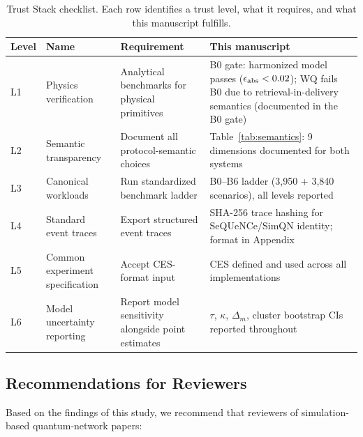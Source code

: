 \documentclass[aps,prapplied,reprint,superscriptaddress]{revtex4-2}
\begin{document}
\begin{table}[t]
\centering
\caption{Trust Stack checklist. Each row identifies a trust level, what it requires, and what this manuscript fulfills.}
\label{tab:truststack}
\small
\begin{tabularx}{\textwidth}{p{1.2cm}p{3.5cm}p{4cm}p{4cm}}
\toprule
Level & Name & Requirement & This manuscript \\
\midrule
L1 & Physics verification & Analytical benchmarks for physical primitives & B0 gate: harmonized model passes ($\epsilon_{\rm abs} < 0.02$); WQ fails B0 due to retrieval-in-delivery semantics (documented in the B0 gate) \\
L2 & Semantic transparency & Document all protocol-semantic choices & Table~\ref{tab:semantics}: 9 dimensions documented for both systems \\
L3 & Canonical workloads & Run standardized benchmark ladder & B0--B6 ladder (3,950 + 3,840 scenarios), all levels reported \\
L4 & Standard event traces & Export structured event traces & SHA-256 trace hashing for SeQUeNCe/SimQN identity; format in Appendix \\
L5 & Common experiment specification & Accept CES-format input & CES defined and used across all implementations \\
L6 & Model uncertainty reporting & Report model sensitivity alongside point estimates & $\tau$, $\kappa$, $\Delta_m$, cluster bootstrap CIs reported throughout \\
\bottomrule
\end{tabularx}
\end{table}

\subsection{Recommendations for Reviewers}

Based on the findings of this study, we recommend that reviewers of simulation-based quantum-network papers:
\end{document}
